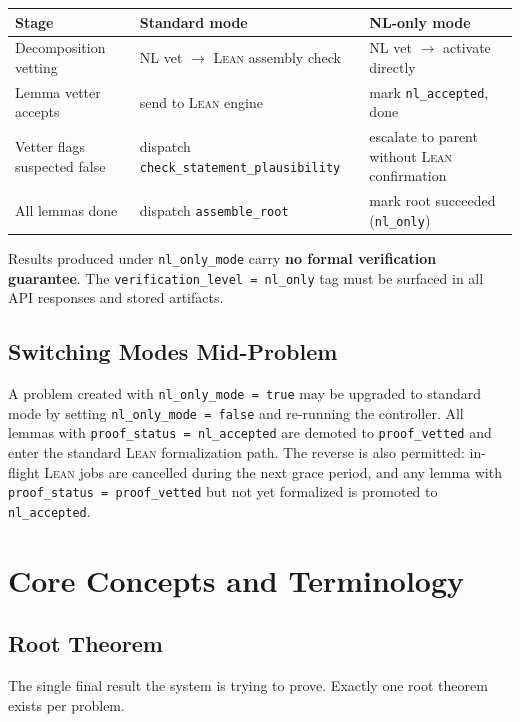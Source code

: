 \documentclass[11pt,a4paper]{article}
\newcommand{\Lean}{\textsc{Lean}}
\begin{document}
\begin{longtable}{p{} p{} p{}}
\toprule
Stage & Standard mode & NL-only mode \\
\midrule
Decomposition vetting & NL vet $\to$ \Lean{} assembly check & NL vet $\to$ activate directly \\
Lemma vetter accepts & send to \Lean{} engine & mark \texttt{nl\_accepted}, done \\
Vetter flags suspected false & dispatch \texttt{check\_statement\_plausibility} & escalate to parent without \Lean{} confirmation \\
All lemmas done & dispatch \texttt{assemble\_root} & mark root succeeded (\texttt{nl\_only}) \\
\bottomrule
\end{longtable}

\begin{notebox}
Results produced under \texttt{nl\_only\_mode} carry \textbf{no formal verification guarantee}. The \texttt{verification\_level = nl\_only} tag must be surfaced in all API responses and stored artifacts.
\end{notebox}

\subsection{Switching Modes Mid-Problem}
A problem created with \texttt{nl\_only\_mode = true} may be upgraded to standard mode by setting \texttt{nl\_only\_mode = false} and re-running the controller. All lemmas with \texttt{proof\_status = nl\_accepted} are demoted to \texttt{proof\_vetted} and enter the standard \Lean{} formalization path. The reverse is also permitted: in-flight \Lean{} jobs are cancelled during the next grace period, and any lemma with \texttt{proof\_status = proof\_vetted} but not yet formalized is promoted to \texttt{nl\_accepted}.

\section{Core Concepts and Terminology}

\subsection{Root Theorem}
The single final result the system is trying to prove. Exactly one root theorem exists per problem.
\end{document}
